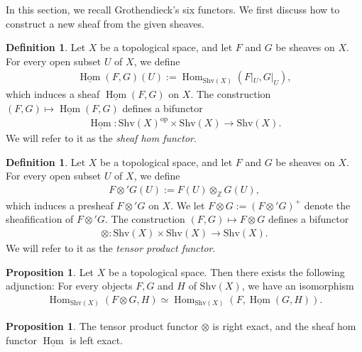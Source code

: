 \documentclass[a4paper,dvipdfmx,11pt,reqno]{amsart}
\DeclareMathOperator{\Hom}{Hom}
\DeclareMathOperator{\myop}{op}
\newcommand{\bbZ}{\mathbb{Z}}
\newcommand{\Shv}{\mathrm{Shv}}
\theoremstyle{definition}
\newtheorem{definition}[theorem]{Definition}
\newtheorem{proposition}[theorem]{Proposition}
\begin{document}
In this section, we recall Grothendieck's six functors.
We first discuss how to construct a new sheaf from the given sheaves.

\begin{definition}
  Let $X$ be a topological space, and let $F$ and $G$ be sheaves on $X$.
  For every open subset $U$ of $X$, we define 
  \begin{align*}
    \underline{\Hom}(F,G)(U) := \Hom_{\Shv(X)}(F|_{U},G|_{U}),
  \end{align*}
  which induces a sheaf $\underline{\Hom}(F,G)$ on $X$.
  The construction $(F,G) \mapsto \underline{\Hom}(F,G)$ defines a bifunctor 
  \begin{align*}
    \underline{\Hom} : \Shv(X)^{\myop} \times \Shv(X) \to \Shv(X).
  \end{align*} 
  We will refer to it as the \textit{sheaf hom functor}.
\end{definition}

\begin{definition}
  Let $X$ be a topological space, and let $F$ and $G$ be sheaves on $X$.
  For every open subset $U$ of $X$, we define 
  \begin{align*}
    F \otimes' G(U) := F(U) \otimes_{\bbZ} G(U),
  \end{align*}
  which induces a presheaf $F \otimes' G$ on $X$.
  We let $F \otimes G := (F \otimes' G)^{+}$ denote the sheafification of $F \otimes' G$.
  The construction $(F,G) \mapsto F \otimes G$ defines a bifunctor 
  \begin{align*}
    \otimes : \Shv(X) \times \Shv(X) \to \Shv(X).
  \end{align*}
  We will refer to it as the \textit{tensor product functor}.
\end{definition}

\begin{proposition}
  Let $X$ be a topological space.
  Then there exists the following adjunction: 
  For every objects $F,G$ and $H$ of $\Shv(X)$, we have an isomorphism
  \begin{align*}
    \Hom_{\Shv(X)}(F \otimes G,H) \simeq \Hom_{\Shv(X)}(F,\underline{\Hom}(G,H)).
  \end{align*}
\end{proposition}

\begin{proposition}
  The tensor product functor $\otimes$ is right exact, and the sheaf hom functor $\underline{\Hom}$ is left exact. 
\end{proposition}
\end{document}

